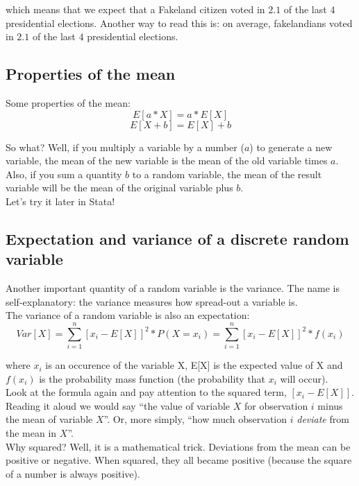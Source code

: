 \documentclass[11pt]{article}
\begin{document}
which means that we expect that a Fakeland citizen voted in $2.1$ of the last $4$ presidential elections. Another way to read this is: on average, fakelandians voted in $2.1$ of the last $4$ presidential elections.

	\subsection*{Properties of the mean}
	
	Some properties of the mean:
	\[E[a*X] = a * E[X]\]
	\[E[X+ b] = E[X] + b\]
	
	So what? Well, if you multiply a variable by a number ($a$) to generate a new variable, the mean of the new variable is the mean of the old variable times $a$.\\
	
	Also, if you sum a quantity $b$ to a random variable, the mean of the result variable will be the mean of the original variable plus $b$.\\
	
	Let's try it later in Stata!

	\subsection*{Expectation and variance of a discrete random variable}
	Another important quantity of a random variable is the variance. The name is self-explanatory: the variance measures how spread-out a variable is.\\
	
	The variance of a random variable is also an expectation:
	\[Var[X] = \sum\limits_{i=1}^n[x_i - E[X]]^2 * P(X=x_i) =\sum\limits_{i=1}^n[x_i - E[X]]^2 * f(x_i)\]
	
where $x_i$ is an occurence of the variable X, E[X] is the expected value of X and $f(x_i)$ is the probability mass function (the probability that $x_i$ will occur).\\

	Look at the formula again and pay attention to the squared term, $[x_i - E[X]]$. Reading it aloud we would say ``the value of variable $X$ for observation $i$ minus the mean of variable $X$''. Or, more simply, ``how much observation $i$ \emph{deviate} from the mean in $X$''.\\

	Why squared? Well, it is a mathematical trick. Deviations from the mean can be positive or negative. When squared, they all became positive (because the square of a number is always positive).\\
	
\end{document}
